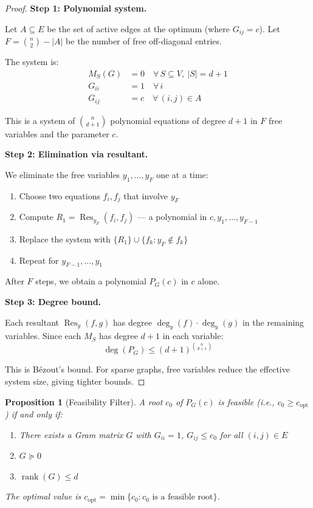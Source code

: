 \documentclass[11pt]{article}
\newtheorem{proposition}[theorem]{Proposition}
\theoremstyle{definition}
\begin{document}
\begin{proof}
\textbf{Step 1: Polynomial system.}

Let $A \subseteq E$ be the set of active edges at the optimum
(where $G_{ij} = c$). Let $F = \binom{n}{2} - |A|$ be the number of
free off-diagonal entries.

The system is:
\begin{align}
M_S(G) &= 0 \quad \forall\, S \subseteq V,\ |S| = d+1 \label{eq:minors}\\
G_{ii} &= 1 \quad \forall\, i \label{eq:diag}\\
G_{ij} &= c \quad \forall\, (i,j) \in A \label{eq:active}
\end{align}

This is a system of $\binom{n}{d+1}$ polynomial equations of degree $d+1$
in $F$ free variables and the parameter $c$.

\textbf{Step 2: Elimination via resultant.}

We eliminate the free variables $y_1, \ldots, y_F$ one at a time:
\begin{enumerate}
    \item Choose two equations $f_i, f_j$ that involve $y_F$
    \item Compute $R_1 = \operatorname{Res}_{y_F}(f_i, f_j)$ --- a polynomial
    in $c, y_1, \ldots, y_{F-1}$
    \item Replace the system with $\{R_1\} \cup \{f_k : y_F \notin f_k\}$
    \item Repeat for $y_{F-1}, \ldots, y_1$
\end{enumerate}

After $F$ steps, we obtain a polynomial $P_G(c)$ in $c$ alone.

\textbf{Step 3: Degree bound.}

Each resultant $\operatorname{Res}_y(f,g)$ has degree
$\deg_y(f) \cdot \deg_y(g)$ in the remaining variables. Since each $M_S$
has degree $d+1$ in each variable:
\begin{equation}
\deg(P_G) \le (d+1)^{\binom{n}{d+1}}
\end{equation}

This is B\'{e}zout's bound. For sparse graphs, free variables reduce the
effective system size, giving tighter bounds.
\end{proof}

\begin{proposition}[Feasibility Filter]\label{prop:filter}
A root $c_0$ of $P_G(c)$ is feasible (i.e., $c_0 \ge c_{\mathrm{opt}}$)
if and only if:
\begin{enumerate}
    \item There exists a Gram matrix $G$ with $G_{ii} = 1$,
    $G_{ij} \le c_0$ for all $(i,j) \in E$
    \item $G \succeq 0$
    \item $\operatorname{rank}(G) \le d$
\end{enumerate}

The optimal value is $c_{\mathrm{opt}} = \min\{c_0 : c_0 \text{ is a feasible root}\}$.
\end{proposition}
\end{document}
